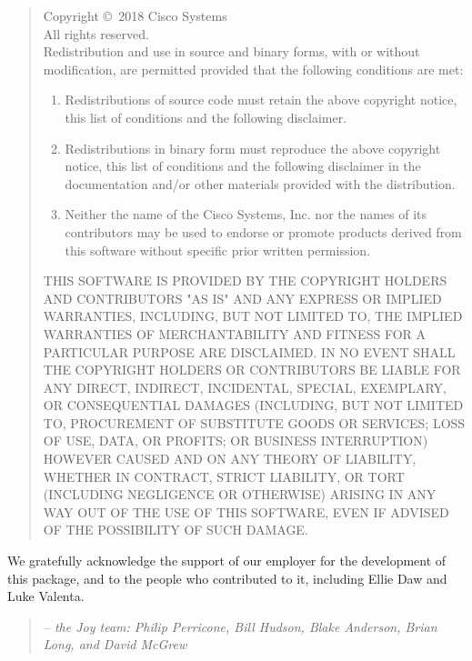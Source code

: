 \documentclass{book}
\begin{document}
\begin{quote}
Copyright \copyright \, 2018 Cisco Systems \\
All rights reserved. \\
 
Redistribution and use in source and binary forms, with or without
modification, are permitted provided that the following conditions are
met:
\begin{enumerate}
  \item Redistributions of source code must retain the above copyright
    notice, this list of conditions and the following disclaimer.
 
  \item Redistributions in binary form must reproduce the above
   copyright notice, this list of conditions and the following
   disclaimer in the documentation and/or other materials provided
   with the distribution.
 
   \item Neither the name of the Cisco Systems, Inc. nor the names of its
   contributors may be used to endorse or promote products derived
   from this software without specific prior written permission.
\end{enumerate}
   
 THIS SOFTWARE IS PROVIDED BY THE COPYRIGHT HOLDERS AND CONTRIBUTORS
 "AS IS" AND ANY EXPRESS OR IMPLIED WARRANTIES, INCLUDING, BUT NOT
 LIMITED TO, THE IMPLIED WARRANTIES OF MERCHANTABILITY AND FITNESS
 FOR A PARTICULAR PURPOSE ARE DISCLAIMED. IN NO EVENT SHALL THE
 COPYRIGHT HOLDERS OR CONTRIBUTORS BE LIABLE FOR ANY DIRECT,
 INDIRECT, INCIDENTAL, SPECIAL, EXEMPLARY, OR CONSEQUENTIAL DAMAGES
 (INCLUDING, BUT NOT LIMITED TO, PROCUREMENT OF SUBSTITUTE GOODS OR
 SERVICES; LOSS OF USE, DATA, OR PROFITS; OR BUSINESS INTERRUPTION)
 HOWEVER CAUSED AND ON ANY THEORY OF LIABILITY, WHETHER IN CONTRACT,
 STRICT LIABILITY, OR TORT (INCLUDING NEGLIGENCE OR OTHERWISE)
 ARISING IN ANY WAY OUT OF THE USE OF THIS SOFTWARE, EVEN IF ADVISED
 OF THE POSSIBILITY OF SUCH DAMAGE.

\end{quote}

We gratefully acknowledge the support of our employer for the
development of this package, and to the people who contributed to it,
including Ellie Daw and Luke Valenta.

\begin{quote}
\textit{ -- the Joy team: Philip Perricone, Bill Hudson, Blake Anderson, Brian Long, and David McGrew}
\end{quote}
\end{document}
